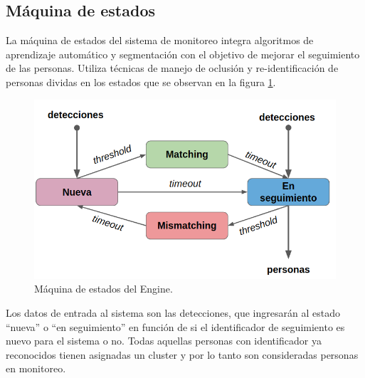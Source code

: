 \newpage

\subsection{Máquina de estados}
\label{sec:maquinaEstados}

La máquina de estados del sistema de monitoreo integra algoritmos de aprendizaje automático y segmentación con el objetivo de mejorar el seguimiento de las personas. Utiliza técnicas de manejo de oclusión y re-identificación de personas dividas en los estados que se observan en la figura \ref{fig:maquinaEstados}.

\begin{figure}[ht]
	\centering
	\includegraphics[scale=.6]{./Figures/maquinaEstados.png}
	\caption{Máquina de estados del Engine.}
	\label{fig:maquinaEstados}
\end{figure}

Los datos de entrada al sistema son las detecciones, que ingresarán al estado ``nueva'' o ``en seguimiento'' en función de si el identificador de seguimiento es nuevo para el sistema o no. Todas aquellas personas con identificador ya reconocidos tienen asignadas un cluster y por lo tanto son consideradas personas en monitoreo.

